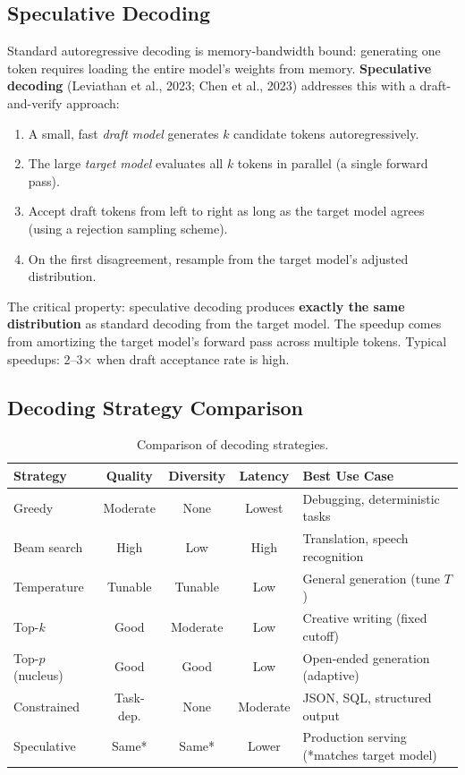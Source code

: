\subsection{Speculative Decoding}
\label{sec:speculative}

Standard autoregressive decoding is memory-bandwidth bound: generating one token
requires loading the entire model's weights from memory.
\textbf{Speculative decoding} (Leviathan et al., 2023; Chen et al., 2023)
addresses this with a draft-and-verify approach:

\begin{enumerate}
    \item A small, fast \emph{draft model} generates $k$ candidate tokens
          autoregressively.
    \item The large \emph{target model} evaluates all $k$ tokens in parallel
          (a single forward pass).
    \item Accept draft tokens from left to right as long as the target model
          agrees (using a rejection sampling scheme).
    \item On the first disagreement, resample from the target model's adjusted
          distribution.
\end{enumerate}

The critical property: speculative decoding produces \textbf{exactly the same
distribution} as standard decoding from the target model.  The speedup comes from
amortizing the target model's forward pass across multiple tokens.  Typical
speedups: 2--3$\times$ when draft acceptance rate is high.

\subsection{Decoding Strategy Comparison}

\begin{table}[H]
\centering
\caption{Comparison of decoding strategies.}
\label{tab:decoding}
\begin{tabularx}{\textwidth}{@{}l c c c X@{}}
\toprule
\textbf{Strategy} & \textbf{Quality} & \textbf{Diversity} & \textbf{Latency} & \textbf{Best Use Case} \\
\midrule
Greedy          & Moderate & None   & Lowest  & Debugging, deterministic tasks \\
Beam search     & High     & Low    & High    & Translation, speech recognition \\
Temperature     & Tunable  & Tunable & Low    & General generation (tune $T$) \\
Top-$k$         & Good     & Moderate & Low   & Creative writing (fixed cutoff) \\
Top-$p$ (nucleus) & Good   & Good   & Low    & Open-ended generation (adaptive) \\
Constrained     & Task-dep.& None   & Moderate & JSON, SQL, structured output \\
Speculative     & Same*    & Same*  & Lower  & Production serving (*matches target model) \\
\bottomrule
\end{tabularx}
\end{table}


